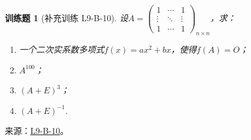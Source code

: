 \documentclass[12pt,fontset=fandol]{ctexart}
\newtheorem{exercise}{训练题}[section]
\begin{document}
\begin{exercise}[补充训练 L9-B-10]\label{prob:L9-B-10}
设$A=\begin{pmatrix}
                1      & \cdots & 1      \\
                \vdots & \ddots & \vdots \\
                1      & \cdots & 1
            \end{pmatrix}_{n \times n}$，求：
        \begin{enumerate}
            \item 一个二次实系数多项式$f(x)=ax^2+bx$，使得$f(A)=O$；
            \item $A^{100}$；
            \item $(A+E)^3$；
            \item $(A+E)^{-1}$.
        \end{enumerate}
\end{exercise}
\noindent 来源：\href{https://github.com/yhwu-is/Linear-Algebra-Left-Undone/blob/new/%E8%AE%B2%E4%B9%89/%E4%B8%93%E9%A2%98/9%20%E7%9F%A9%E9%98%B5%E8%BF%90%E7%AE%97%E8%BF%9B%E9%98%B6.tex}{L9-B-10}。
\end{document}
